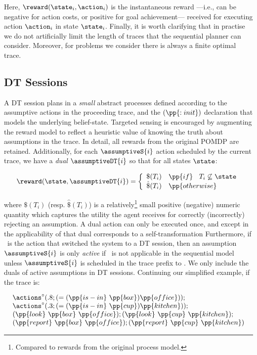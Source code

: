\noindent  Here,  $\reward(\state_i, \action_i)$ is the instantaneous
reward ---i.e., can be negative for action costs, or positive for goal
achievement--- received for executing action $\action_i$ in state
$\state_i$. Finally, it is worth clarifying that in practise we do not
artificially limit the length of traces that the sequential planner
can consider. Moreover, for problems we consider there is always a
finite optimal trace.


\subsection{DT Sessions}

A DT session plans in a {\em small} abstract processes defined
according to the assumptive actions in the proceeding trace, and the
$(\pp{:init})$ declaration that models the underlying
belief-state. Targeted sensing is encouraged by augmenting the reward
model to reflect a heuristic value of knowing the truth about
assumptions in the trace. In detail, all rewards from the original
POMDP are retained. Additionally, for each $\assumptiveS{i}$ action
scheduled by the current trace, we have a {\em dual}
$\assumptiveDT{i}$ so that for all states $\state$:

\small
\[
\reward(\state, \assumptiveDT{i}) = \bigg\{ \begin{array}{ll}
\$(T_i) & \pp{if}~\;\;T_i \not\subseteq \state \\
\hat\$(T_i) & \pp{otherwise} \\
\end{array}
\]
\normalsize

\noindent where $\$(T_i)$ (resp. $\hat\$(T_i)$) is a 
relatively\footnote{Compared to rewards from the original process
model.} small positive (negative) numeric quantity which captures the
utility the agent receives for correctly (incorrectly) rejecting an
assumption. A dual action can only be executed once, and except in the
applicability of that dual corresponds to a self-transformation
Furthermore, if \switchAction\ is the action that switched the system
to a DT session, then an assumption $\assumptiveS{i}$ is only {\em
active} if
\switchAction\ is not applicable in the sequential model unless
$\assumptiveS{i}$ is scheduled in the trace prefix
to \switchAction. We only include the duals of active assumptions in
DT sessions. Continuing our simplified example, if the trace is:

\small
\[
\begin{array}{l}
\actions^{\circ}(.8;(=(\pp{is-in}~\pp{box})\pp{office}));\\
\actions^{\circ}(.3;(=(\pp{is-in}~\pp{cup})\pp{kitchen}));\\
(\pp{look}~\pp{box}~\pp{office});
(\pp{look}~\pp{cup}~\pp{kitchen});\\
(\pp{report}~\pp{box}~\pp{office}); 
(\pp{report}~\pp{cup}~\pp{kitchen})
\end{array}
\]
\normalsize

